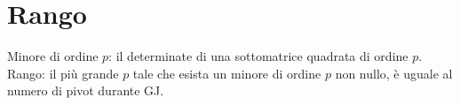 \section{Rango}
Minore di ordine $p$: il determinate di una sottomatrice quadrata di ordine $p$. \\
Rango: il più grande $p$ tale che esista un minore di ordine $p$ non nullo,
è uguale al numero di pivot durante GJ. \\